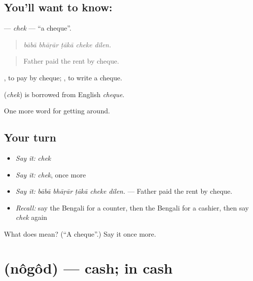 \subsection*{You'll want to know: }
\textbf{} — \emph{chek} — \textquotedblleft{}a cheque\textquotedblright{}.

\begin{quote}
    
\end{quote}

\begin{quote}
\emph{bābā bhāṛār ṭākā cheke dilen.}
\end{quote}

\begin{quote}
Father paid the rent by cheque.
\end{quote}

 , to pay by cheque;  , to write a cheque.

\begin{cousinweb}
\textbf{} (\emph{chek}) is borrowed from English \emph{cheque}.
\end{cousinweb}

\begin{grammarlens}[title={What you've built}]
One more word for getting around.
\end{grammarlens}

\subsection*{Your turn}
\begin{itemize}
\raggedright
  \item \emph{Say it:} \emph{chek}
  \item \emph{Say it:} \emph{chek}, once more
  \item \emph{Say it:} \emph{bābā bhāṛār ṭākā cheke dilen.} — Father paid the rent by cheque.
  \item \emph{Recall:} say the Bengali for a counter, then the Bengali for a cashier, then say \emph{chek} again
\end{itemize}

\begin{tcolorbox}[breakable,colback=teal!4,colframe=teal!35!black,title={Before you move on}]
What does  mean? (\textquotedblleft{}A cheque\textquotedblright{}.) Say it once more.
\end{tcolorbox}
\section[\texorpdfstring{\bn{নগদ} (nôgôd)}{নগদ (nôgôd)}]{ (nôgôd) — cash; in cash}

